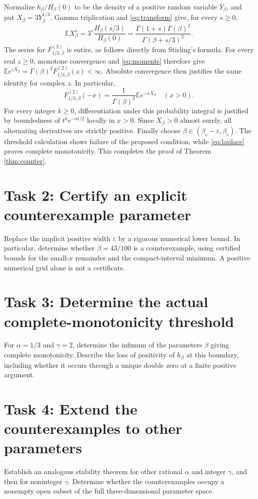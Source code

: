 \documentclass[11pt]{article}
\newcommand{\E}{\mathbb E}
\begin{document}
Normalize $h_\beta/H_\beta(0)$ to be the density of a positive random
variable $Y_\beta$, and put $X_\beta=3Y_\beta^{1/3}$.
Gamma triplication and \eqref{eq:transform} give, for every $s\geq0$,
\begin{equation}\label{eq:moments}
 \E X_\beta^s
 =3^s\frac{H_\beta(s/3)}{H_\beta(0)}
 =\frac{\Gamma(1+s)\Gamma(\beta)^2}{\Gamma(\beta+s/3)^2}.
\end{equation}
The series for $F_{1/3,\beta}^{(2)}$ is entire, as follows directly from
Stirling's formula. For every real $z\geq0$, monotone convergence and
\eqref{eq:moments} therefore give
$\E e^{zX_\beta}=\Gamma(\beta)^2 F_{1/3,\beta}^{(2)}(z)<\infty$.
Absolute convergence then justifies the same identity for complex $z$.
In particular,
\begin{equation}\label{eq:laplace}
 F_{1/3,\beta}^{(2)}(-x)
 =\frac1{\Gamma(\beta)^2}\E e^{-xX_\beta}\quad(x>0).
\end{equation}
For every integer $k\geq0$, differentiation under this probability
integral is justified by boundedness of $t^k e^{-xt/2}$ locally in $x>0$.
Since $X_\beta>0$ almost surely, all alternating derivatives are strictly
positive. Finally choose $\beta\in(\beta_c-\varepsilon,\beta_c)$.
The threshold calculation shows failure of the proposed condition,
while \eqref{eq:laplace} proves complete monotonicity. This completes the
proof of Theorem \ref{thm:counter}.

\section*{Task 2: Certify an explicit counterexample parameter}
Replace the implicit positive width $\varepsilon$ by a rigorous numerical
lower bound. In particular, determine whether $\beta=43/100$ is a
counterexample, using certified bounds for the small-$x$ remainder and
the compact-interval minimum. A positive numerical grid alone is not
a certificate.

\section*{Task 3: Determine the actual complete-monotonicity threshold}
For $\alpha=1/3$ and $\gamma=2$, determine the infimum of the parameters
$\beta$ giving complete monotonicity. Describe the loss of positivity
of $h_\beta$ at this boundary, including whether it occurs through a
unique double zero at a finite positive argument.

\section*{Task 4: Extend the counterexamples to other parameters}
Establish an analogous stability theorem for other rational $\alpha$
and integer $\gamma$, and then for noninteger $\gamma$. Determine
whether the counterexamples occupy a nonempty open subset of the full
three-dimensional parameter space.
\end{document}
